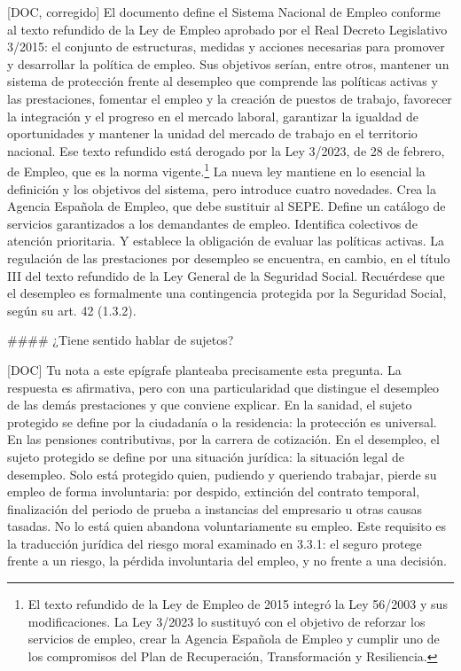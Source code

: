\documentclass[10pt,a4paper]{article}
\begin{document}
[DOC, corregido] El documento define el Sistema Nacional de Empleo conforme al texto refundido de la Ley de Empleo aprobado por el Real Decreto Legislativo 3/2015: el conjunto de estructuras, medidas y acciones necesarias para promover y desarrollar la política de empleo. Sus objetivos serían, entre otros, mantener un sistema de protección frente al desempleo que comprende las políticas activas y las prestaciones, fomentar el empleo y la creación de puestos de trabajo, favorecer la integración y el progreso en el mercado laboral, garantizar la igualdad de oportunidades y mantener la unidad del mercado de trabajo en el territorio nacional. Ese texto refundido está derogado por la Ley 3/2023, de 28 de febrero, de Empleo, que es la norma vigente.\footnote{El texto refundido de la Ley de Empleo de 2015 integró la Ley 56/2003 y sus modificaciones. La Ley 3/2023 lo sustituyó con el objetivo de reforzar los servicios de empleo, crear la Agencia Española de Empleo y cumplir uno de los compromisos del Plan de Recuperación, Transformación y Resiliencia.
} La nueva ley mantiene en lo esencial la definición y los objetivos del sistema, pero introduce cuatro novedades. Crea la Agencia Española de Empleo, que debe sustituir al SEPE. Define un catálogo de servicios garantizados a los demandantes de empleo. Identifica colectivos de atención prioritaria. Y establece la obligación de evaluar las políticas activas. La regulación de las prestaciones por desempleo se encuentra, en cambio, en el título III del texto refundido de la Ley General de la Seguridad Social. Recuérdese que el desempleo es formalmente una contingencia protegida por la Seguridad Social, según su art. 42 (1.3.2).








#### ¿Tiene sentido hablar de sujetos?

[DOC] Tu nota a este epígrafe planteaba precisamente esta pregunta. La respuesta es afirmativa, pero con una particularidad que distingue el desempleo de las demás prestaciones y que conviene explicar. En la sanidad, el sujeto protegido se define por la ciudadanía o la residencia: la protección es universal. En las pensiones contributivas, por la carrera de cotización. En el desempleo, el sujeto protegido se define por una situación jurídica: la situación legal de desempleo. Solo está protegido quien, pudiendo y queriendo trabajar, pierde su empleo de forma involuntaria: por despido, extinción del contrato temporal, finalización del periodo de prueba a instancias del empresario u otras causas tasadas. No lo está quien abandona voluntariamente su empleo. Este requisito es la traducción jurídica del riesgo moral examinado en 3.3.1: el seguro protege frente a un riesgo, la pérdida involuntaria del empleo, y no frente a una decisión.
\end{document}
